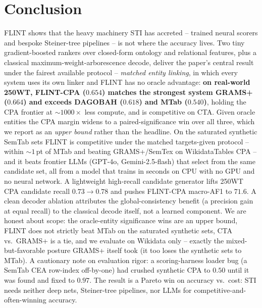 \documentclass[11pt]{article}
\begin{document}
\section{Conclusion}
\label{sec:conclusion}
FLINT shows that the heavy machinery STI has accreted -- trained neural scorers and
bespoke Steiner-tree pipelines -- is not where the accuracy lives. Two tiny
gradient-boosted rankers over closed-form ontology and relational features, plus a
classical maximum-weight-arborescence decode, deliver the paper's central result under
the fairest available protocol -- \emph{matched entity linking}, in which every system
uses its own linker and FLINT has no oracle advantage: \textbf{on real-world 250WT,
FLINT-CPA ($0.654$) matches the strongest system GRAMS+ ($0.664$) and exceeds DAGOBAH
($0.618$) and MTab ($0.540$)}, holding the CPA frontier at $\sim$$1000\times$ less
compute, and is competitive on CTA. Given oracle entities the CPA margin widens to a
paired-significance win over all three, which we report as an \emph{upper bound} rather
than the headline. On the saturated synthetic SemTab sets FLINT is competitive under the
matched targets-given protocol -- within $\sim$$1$\,pt of MTab and beating GRAMS+/SemTex
on WikidataTables CPA -- and it beats frontier LLMs (GPT-4o, Gemini-2.5-flash) that
select from the same candidate set, all from a model that trains in seconds on CPU with
no GPU and no neural network. A lightweight high-recall candidate generator lifts 250WT
CPA candidate recall $0.73\!\to\!0.78$ and pushes FLINT-CPA macro-AF1 to $71.6$. A clean
decoder ablation attributes the global-consistency benefit (a precision gain at equal
recall) to the classical decode itself, not a learned component. We are honest about
scope: the oracle-entity significance wins are an upper bound, FLINT does not strictly
beat MTab on the saturated synthetic sets, CTA vs.\ GRAMS+ is a tie, and we evaluate on
Wikidata only -- exactly the mixed-but-favorable posture GRAMS+ itself took (it too loses
the synthetic sets to MTab). A cautionary note on evaluation rigor:
a scoring-harness loader bug (a SemTab CEA row-index off-by-one) had crushed synthetic
CPA to $0.50$ until it was found and fixed to $0.97$. The result is a Pareto win on
accuracy vs.\ cost: STI needs neither deep nets, Steiner-tree pipelines, nor LLMs for
competitive-and-often-winning accuracy.



\end{document}
